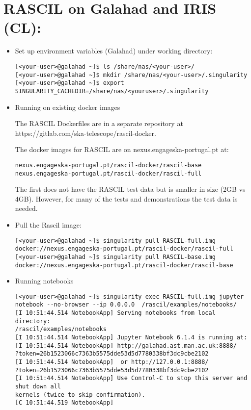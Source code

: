\documentclass[english]{article}
\begin{document}
\section{RASCIL on Galahad and IRIS (CL):}
\begin{itemize}
    \item Set up environment variables (Galahad) under working directory:
\begin{verbatim}
[<your-user>@galahad ~]$ ls /share/nas/<your-user>/
[<your-user>@galahad ~]$ mkdir /share/nas/<your-user>/.singularity
[<your-user>@galahad ~]$ export SINGULARITY_CACHEDIR=/share/nas/<youruser>/.singularity

\end{verbatim}

    \item Running on existing docker images
    
The RASCIL Dockerfiles are in a separate repository at https://gitlab.com/ska-telescope/rascil-docker.

The docker images for RASCIL are on nexus.engageska-portugal.pt at:
\begin{verbatim}
nexus.engageska-portugal.pt/rascil-docker/rascil-base
nexus.engageska-portugal.pt/rascil-docker/rascil-full
\end{verbatim}
The first does not have the RASCIL test data but is smaller in size (2GB vs 4GB). However, for many of the tests and demonstrations the test data is needed.

    \item Pull the Rascil image:
 \begin{verbatim}   
[<your-user>@galahad ~]$ singularity pull RASCIL-full.img 
docker://nexus.engageska-portugal.pt/rascil-docker/rascil-full
[<your-user>@galahad ~]$ singularity pull RASCIL-base.img 
docker://nexus.engageska-portugal.pt/rascil-docker/rascil-base
\end{verbatim}


    \item Running notebooks
    \begin{verbatim}
[<your-user>@galahad ~]$ singularity exec RASCIL-full.img jupyter 
notebook --no-browser --ip 0.0.0.0  /rascil/examples/notebooks/
[I 10:51:44.514 NotebookApp] Serving notebooks from local directory:
/rascil/examples/notebooks
[I 10:51:44.514 NotebookApp] Jupyter Notebook 6.1.4 is running at:
[I 10:51:44.514 NotebookApp] http://galahad.ast.man.ac.uk:8888/
?token=26b1523066c7363b5575dde53d5d7780338bf3dc9cbe2102
[I 10:51:44.514 NotebookApp]  or http://127.0.0.1:8888/
?token=26b1523066c7363b5575dde53d5d7780338bf3dc9cbe2102
[I 10:51:44.514 NotebookApp] Use Control-C to stop this server and shut down all
kernels (twice to skip confirmation).
[C 10:51:44.519 NotebookApp]


\end{verbatim}
\end{itemize}
\end{document}
